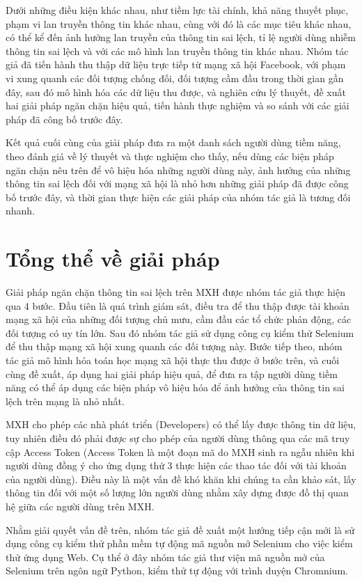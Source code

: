 Dưới những điều kiện khác nhau, như tiềm lực tài chính, khả năng thuyết phục, phạm vi lan truyền thông tin khác nhau, cùng với đó là các mục tiêu khác nhau, có thể kể đến ảnh hưởng lan truyền của thông tin sai lệch, tỉ lệ người dùng nhiễm thông tin sai lệch và với các mô hình lan truyền thông tin khác nhau. Nhóm tác giả đã tiến hành thu thập dữ liệu trực tiếp từ mạng xã hội Facebook, với phạm vi xung quanh các đối tượng chống đối, đối tượng cầm đầu trong thời gian gần đây, sau đó mô hình hóa các dữ liệu thu được, và nghiên cứu lý thuyết, đề xuất hai giải pháp ngăn chặn hiệu quả, tiến hành thực nghiệm và so sánh với các giải pháp đã công bố trước đây. 

Kết quả cuối cùng của giải pháp đưa ra một danh sách người dùng tiềm năng, theo đánh giá về lý thuyết và thực nghiệm cho thấy, nếu dùng các biện pháp ngăn chặn nêu trên để vô hiệu hóa những người dùng này, ảnh hưởng của những thông tin sai lệch đối với mạng xã hội là nhỏ hơn những giải pháp đã được công bố trước đây, và thời gian thực hiện các giải pháp của nhóm tác giả là tương đối nhanh.

\section{Tổng thể về giải pháp}
Giải pháp ngăn chặn thông tin sai lệch trên MXH được nhóm tác giả thực hiện qua 4 bước. Đầu tiên là quá trình giám sát, điều tra để thu thập được tài khoản mạng xã hội của những đối tượng chủ mưu, cầm đầu các tổ chức phản động, các đối tượng có uy tín lớn. Sau đó nhóm tác giả sử dụng công cụ kiểm thử Selenium để thu thập mạng xã hội xung quanh các đối tượng này. Bước tiếp theo, nhóm tác giả mô hình hóa toán học mạng xã hội thực thu được ở bước trên, và cuối cùng đề xuất, áp dụng hai giải pháp hiệu quả, để đưa ra tập người dùng tiềm năng có thể áp dụng các biện pháp vô hiệu hóa để ảnh hưởng của thông tin sai lệch trên mạng là nhỏ nhất.

MXH cho phép các nhà phát triển (Developers) có thể lấy được thông tin dữ liệu, tuy nhiên điều đó phải được sự cho phép của người dùng thông qua các mã truy cập Access Token (Access Token là một đoạn mã do MXH sinh ra ngẫu nhiên khi người dùng đồng ý cho ứng dụng thứ 3 thực hiện các thao tác đối với tài khoản của người dùng). Điều này là một vấn đề khó khăn khi chúng ta cần khảo sát, lấy thông tin đối với một số lượng lớn người dùng nhằm xây dựng được đồ thị quan hệ giữa các người dùng trên MXH.

Nhằm giải quyết vấn đề trên, nhóm tác giả đề xuất một hướng tiếp cận mới là sử dụng công cụ kiểm thử phần mềm tự động mã nguồn mở Selenium cho việc kiểm thử ứng dụng Web. Cụ thể ở đây nhóm tác giả thư viện mã nguồn mở của Selenium trên ngôn ngữ Python, kiểm thử tự động với trình duyện Chromnium.
